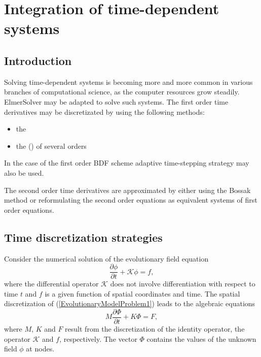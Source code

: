 \newcommand{\ExampleOperator}{\mathcal{K}}

\chapter{Integration of time-dependent systems}
\noindent

\section{Introduction}

Solving time-dependent systems is becoming more and more common 
in various branches of computational science,
as the computer resources grow steadily.
ElmerSolver may be adapted to solve such systems. The first order time 
derivatives may be discretizated by using the following methods:
\begin{itemize}
\item the 
\item the  () of several orders
\end{itemize}
In the case of the first order BDF scheme adaptive time-stepping strategy may also
be used. 

The second order time derivatives are approximated by either using the Bossak 
method or reformulating the second order equations as equivalent systems
of first order equations. 


\section{Time discretization strategies}

Consider the numerical solution of the evolutionary field equation 
\begin{equation}\label{EvolutionaryModelProblem1}
\frac{\partial \phi}{\partial t} %
+\ExampleOperator\phi = f,
\end{equation}
where the differential operator $\ExampleOperator$ does not involve 
differentiation with respect to time $t$ and $f$ is a given function of spatial 
coordinates and time. The spatial discretization of (\ref{EvolutionaryModelProblem1}) 
leads to the algebraic equations 
\begin{equation}\label{EqToTimeDiscretizate}
M\frac{\partial \Phi}{\partial t} + K\Phi = F,
\end{equation}
where $M$, $K$ and $F$ result from the discretization of the identity operator,
the operator $\ExampleOperator$ and $f$, respectively. 
The vector $\Phi$ contains the values of the unknown field $\phi$ at nodes.  

